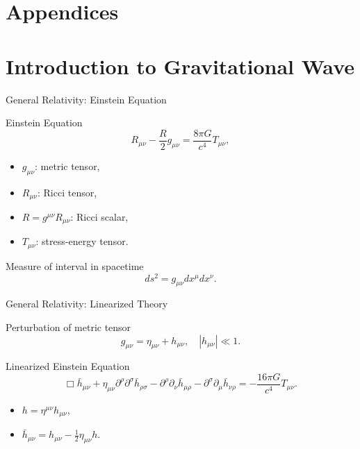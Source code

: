 \documentclass[xcolor=dvipsnames]{beamer}
\begin{document}
\appendix
\section{Appendices}

\iffalse
\section[Introduction to GW]{Introduction to Gravitational Wave}

\begin{frame}[t]{General Relativity: Einstein Equation}
  \begin{block}{Einstein Equation}
    \begin{equation*}
      R_{\mu\nu} - \frac{R}{2} g_{\mu\nu} = \frac{8\pi G}{c^4} T_{\mu\nu},
    \end{equation*}
  \end{block}
  \begin{itemize}
    \item $g_{\mu\nu}$: metric tensor,
    \item $R_{\mu\nu}$: Ricci tensor,
    \item $R = g^{\mu\nu} R_{\mu\nu}$: Ricci scalar,
    \item $T_{\mu\nu}$: stress-energy tensor.
  \end{itemize}
  \begin{block}{Measure of interval in spacetime}
    \begin{equation*}
      ds^2 = g_{\mu\nu} dx^\mu dx^\nu.
    \end{equation*}
  \end{block}
\end{frame}

\begin{frame}[t]{General Relativity: Linearized Theory}
  \begin{block}{Perturbation of metric tensor}
    \begin{equation*}
      g_{\mu\nu} = \eta_{\mu\nu} + h_{\mu\nu}, \quad |h_{\mu\nu}| \ll 1.
    \end{equation*}
  \end{block}
  \begin{block}{Linearized Einstein Equation}
    \begin{equation*}
      \Box \bar{h}_{\mu\nu} + \eta_{\mu\nu} \partial^\rho \partial^\sigma \bar{h}_{\rho\sigma} - \partial^\rho \partial_\nu \bar{h}_{\mu\rho} - \partial^\sigma \partial_\mu \bar{h}_{\nu\rho} = -\frac{16\pi G}{c^4} T_{\mu\nu}.
    \end{equation*}
  \end{block}
  \begin{itemize}
    \item $h = \eta^{\mu\nu} h_{\mu\nu}$,
    \item $\bar{h}_{\mu\nu} = h_{\mu\nu} - \frac{1}{2} \eta_{\mu\nu} h$.
  \end{itemize}
\end{frame}
\end{document}
